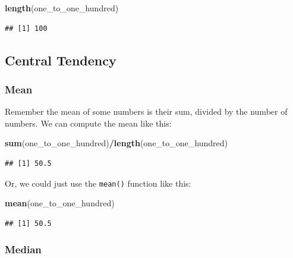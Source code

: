 \documentclass[
]{book}
\newenvironment{Shaded}{\begin{snugshade}}{\end{snugshade}}
\newcommand{\FunctionTok}[1]{\textcolor[rgb]{0.13,0.29,0.53}{\textbf{#1}}}
\newcommand{\NormalTok}[1]{#1}
\newcommand{\SpecialCharTok}[1]{\textcolor[rgb]{0.81,0.36,0.00}{\textbf{#1}}}
\begin{document}
\begin{Shaded}
\begin{Highlighting}[]
\FunctionTok{length}\NormalTok{(one\_to\_one\_hundred)}
\end{Highlighting}
\end{Shaded}

\begin{verbatim}
## [1] 100
\end{verbatim}

\hypertarget{central-tendency}{%
\subsection{Central Tendency}\label{central-tendency}}

\hypertarget{mean}{%
\subsubsection{Mean}\label{mean}}

Remember the mean of some numbers is their sum, divided by the number of numbers. We can compute the mean like this:

\begin{Shaded}
\begin{Highlighting}[]
\FunctionTok{sum}\NormalTok{(one\_to\_one\_hundred)}\SpecialCharTok{/}\FunctionTok{length}\NormalTok{(one\_to\_one\_hundred)}
\end{Highlighting}
\end{Shaded}

\begin{verbatim}
## [1] 50.5
\end{verbatim}

Or, we could just use the \texttt{mean()} function like this:

\begin{Shaded}
\begin{Highlighting}[]
\FunctionTok{mean}\NormalTok{(one\_to\_one\_hundred)}
\end{Highlighting}
\end{Shaded}

\begin{verbatim}
## [1] 50.5
\end{verbatim}

\hypertarget{median}{%
\subsubsection{Median}\label{median}}
\end{document}
